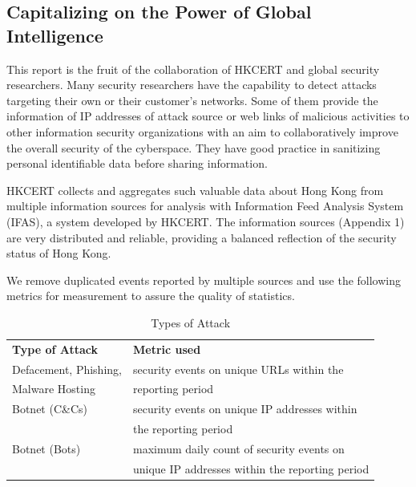 \documentclass[__FONT_SIZE__]{extarticle}
\begin{document}
\subsection*{Capitalizing on the Power of Global Intelligence}

This report is the fruit of the collaboration of HKCERT and global security researchers. Many security researchers have the capability to detect attacks targeting their own or their customer's networks. Some of them provide the information of IP addresses of attack source or web links of malicious activities to other information security organizations with an aim to collaboratively improve the overall security of the cyberspace. They have good practice in sanitizing personal identifiable data before sharing information.

HKCERT collects and aggregates such valuable data about Hong Kong from multiple information sources for analysis with Information Feed Analysis System (IFAS), a system developed by HKCERT. The information sources (Appendix 1) are very distributed and reliable, providing a balanced reflection of the security status of Hong Kong.

We remove duplicated events reported by multiple sources and use the following metrics for measurement to assure the quality of statistics.

\begin{table}[b]
\centering
\caption{Types of Attack}
\begin{tabular}{ll}
\hline
\textbf{ Type of Attack}              & \textbf{ Metric used}                                                                         \\\hhline{==}
Defacement, Phishing,                 & security events on unique URLs within the             \\
Malware Hosting                       & reporting period\\\hline
Botnet (C\&Cs)                        & security events on unique IP addresses within    \\
                                      & the reporting period \\\hline
Botnet (Bots)                         & maximum daily count of security events on  \\
                                      & unique IP addresses within the reporting period \\\hline
\end{tabular}

\end{table}
\end{document}
